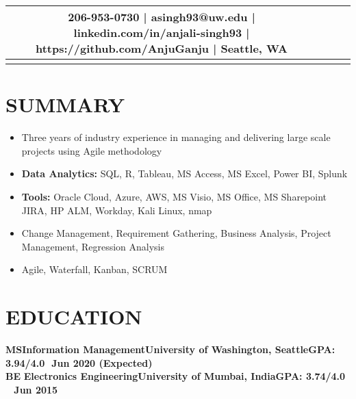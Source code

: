 \documentclass[11.5pt,a4paper,roman]{moderncv}        %
\begin{document}
\makecvtitle
\vspace*{-19mm}

\begin{center}
\begin{tabular}{ c c c c }
   206-953-0730  | asingh93@uw.edu | linkedin.com/in/anjali-singh93 | https://github.com/AnjuGanju | Seattle, WA \\  
\hline
\vspace*{-7mm}
\end{tabular}
\end{center}


\section{\large SUMMARY}

\vspace{-1mm} 
\begin{itemize}
\renewcommand{\labelitemi}{$\bullet$}
\item Three years of industry experience in managing and delivering large scale projects using Agile methodology
 \item \textbf{Data Analytics:} SQL, R, Tableau, MS Access, MS Excel, Power BI, Splunk
 \item \textbf{Tools:} Oracle Cloud, Azure, AWS, MS Visio, MS Office, MS Sharepoint JIRA, HP ALM, Workday, Kali Linux, nmap
 \item Change Management, Requirement Gathering, Business Analysis, Project Management, Regression Analysis
 \item Agile, Waterfall, Kanban, SCRUM
 \end{itemize}
 \vspace{-3mm} 

\section{\large EDUCATION}


\textbf{MS\quad\quad Information Management\quad\quad University of Washington, Seattle\quad\quad GPA: 3.94/4.0\quad\,\, Jun 2020 (Expected)\\}
\textbf{BE\quad\quad\,\,Electronics Engineering\quad\quad\quad University of Mumbai, India\quad\quad\quad\quad GPA: 3.74/4.0 \quad\quad\quad\quad\quad\,\,\, Jun 2015\\}
 \vspace{-8mm} 
\end{document}
